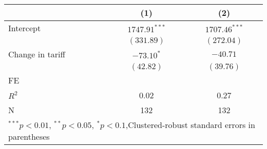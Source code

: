 
\begin{tabular}{l c c }
\hline
 & (1) & (2) \\
\hline
Intercept & $1747.91^{***}$ & $1707.46^{***}$ \\
            & $(331.89)$      & $(272.04)$      \\
Change in tariff     & $-73.10^{*}$    & $-40.71$        \\
            & $(42.82)$       & $(39.76)$       \\
\hline
FE          &                &                \\ 
\hline
$R^2$       & 0.02            & 0.27            \\
N           & 132             & 132             \\
\hline
\multicolumn{3}{l}{\scriptsize{$^{***}p<0.01$, $^{**}p<0.05$, $^*p<0.1$,Clustered-robust standard errors in parentheses}}
\end{tabular}
